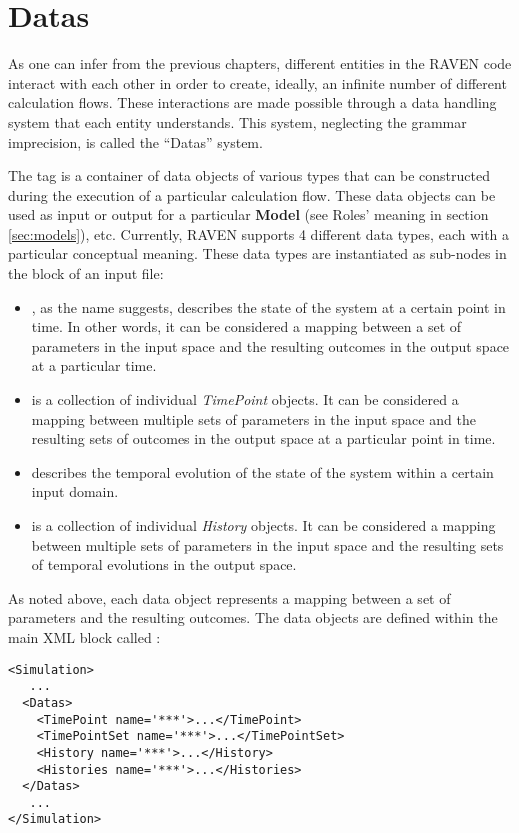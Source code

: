\section{Datas \\ \vspace{2 mm} {\small }}
\label{sec:Datas}

As one can infer from the previous chapters, different entities in the RAVEN
code interact with each other in order to create, ideally, an infinite number of
different calculation flows.
%
These interactions are made possible through a data handling system that each
entity understands.
%
This system, neglecting the grammar imprecision, is called the ``Datas''
system.

The  tag is a container of data objects of various types that can
be constructed during the execution of a particular calculation flow.
%
These data objects can be used as input or output for a particular
\textbf{Model} (see Roles' meaning in section \ref{sec:models}), etc.
%
Currently, RAVEN supports 4 different data types, each with a particular
conceptual meaning.
%
These data types are instantiated as sub-nodes in the  block of
an input file:
\begin{itemize}
  \item {}, as the name suggests, describes the state of the
  system at a certain point in time.
  In other words, it can be considered a mapping between a set of parameters
  in the input space and the resulting outcomes in the output space at a
  particular time.
  \item {} is a collection of individual \textit{TimePoint}
  objects.
  It can be considered a mapping between multiple sets of parameters in the
  input space and the resulting sets of outcomes in the output space at a
  particular point in time.
  \item {} describes the temporal evolution of the state of the
  system within a certain input domain.
  \item {} is a collection of individual \textit{History}
  objects.
  It can be considered a mapping between multiple sets of parameters in the
  input space and the resulting sets of temporal evolutions in the output
  space.
\end{itemize}

As noted above, each data object represents a mapping between a set of
parameters and the resulting outcomes.
%
The data objects are defined within the main XML block called :
\begin{lstlisting}[style=XML]
<Simulation>
   ...
  <Datas>
    <TimePoint name='***'>...</TimePoint>
    <TimePointSet name='***'>...</TimePointSet>
    <History name='***'>...</History>
    <Histories name='***'>...</Histories>
  </Datas>
   ...
</Simulation>
\end{lstlisting}

